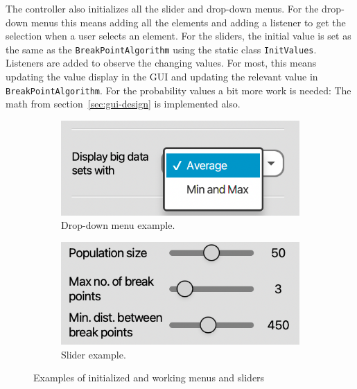 The controller also initializes all the slider and drop-down menus. For the
drop-down menus this means adding all the elements and adding a listener to get
the selection when a user selects an element. For the sliders, the initial value
is set as the same as the \texttt{BreakPointAlgorithm} using the static class
\texttt{InitValues}. Listeners are added to observe the changing values. For
most, this means updating the value display in the GUI and updating the relevant
value in \texttt{BreakPointAlgorithm}. For the probability values a bit more
work is needed: The math from section~\ref{sec:gui-design} is implemented also. 

\begin{figure}[ht]
    \centering
    \begin{subfigure}[b]{.48\textwidth}
        \centering
        \includegraphics[width=\textwidth]{fig/drop-down-menu.png}
        \caption{Drop-down menu example. }
        \label{fig:gui-drop-down}
    \end{subfigure}
    \hfill
    \begin{subfigure}[b]{.48\textwidth}
        \centering
        \includegraphics[width=\textwidth]{fig/sliders.png}
        \caption{Slider example.}
        \label{fig:gui-slider}
    \end{subfigure}
    \caption{Examples of initialized and working menus and sliders}
    \label{fig:gui-controls}
\end{figure}

